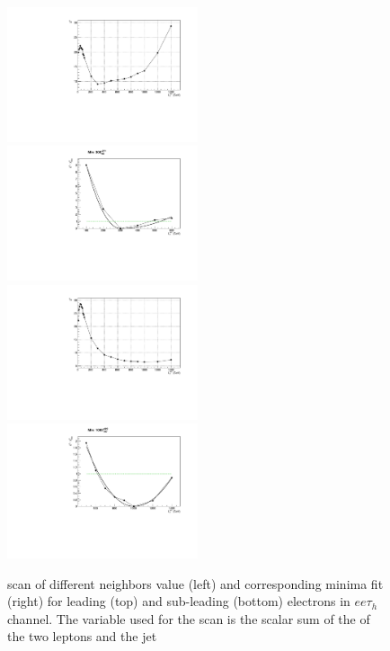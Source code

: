 \begin{figure}
\includegraphics[width=0.5\textwidth]{4_Analisys/pics/8TeV/ProfileNeighbors/EE/eid12Tight_h2taucuts/LT_chi2.pdf}
\includegraphics[width=0.5\textwidth]{4_Analisys/pics/8TeV/ProfileNeighbors/EE/eid12Tight_h2taucuts_LT.pdf} \\
\includegraphics[width=0.5\textwidth]{4_Analisys/pics/8TeV/ProfileNeighbors/EE/eid12Medium_h2taucuts020/LT_chi2.pdf}
\includegraphics[width=0.5\textwidth]{4_Analisys/pics/8TeV/ProfileNeighbors/EE/eid12Medium_h2taucuts020_LT.pdf} \\
\caption{\chisq scan of different neighbors value (left) and corresponding minima fit (right) for leading (top) and sub-leading (bottom) electrons in $ee\tau_h$ channel. The variable used for the scan is the scalar sum of the \pT of the two leptons and the jet}
\label{fig:kNN_minima_EET}
\end{figure}


